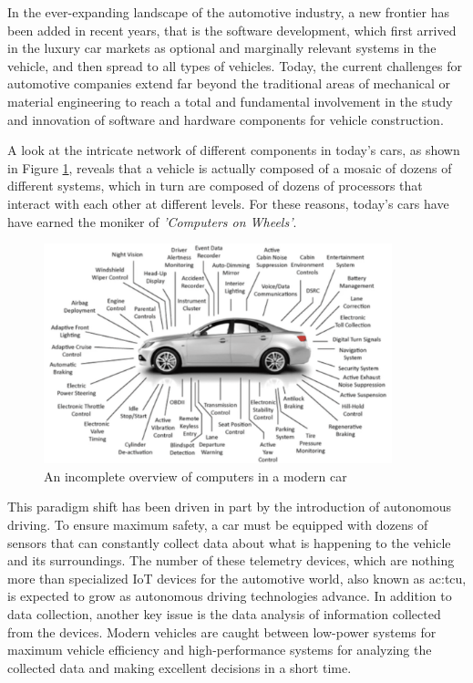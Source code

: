 In the ever-expanding landscape of the automotive industry, a new frontier has been added in recent years, that is the software development, which first arrived in the luxury car markets as optional and marginally relevant systems in the vehicle, and then spread to all types of vehicles. Today, the current challenges for automotive companies extend far beyond the traditional areas of mechanical or material engineering to reach a total and fundamental involvement in the study and innovation of software and hardware components for vehicle construction. 

A look at the intricate network of different components in today's cars, as shown in Figure \ref{fig:VheicleProcessors}, reveals that a vehicle is actually composed of a mosaic of dozens of different systems, which in turn are composed of dozens of processors that interact with each other at different levels. For these reasons, today's cars have have earned the moniker of \textit{'Computers on Wheels'}.
\begin{figure}[h]  %
  \centering
  \includegraphics[width=0.9\textwidth]{images/vehicle_processors.png}  %
  \caption{An incomplete overview of computers in a modern car \cite{ieeeSoftwareDefinedVehicle}}
  \label{fig:VheicleProcessors}
\end{figure}

This paradigm shift has been driven in part by the introduction of autonomous driving. To ensure maximum safety, a car must be equipped with dozens of sensors that can constantly collect data about what is happening to the vehicle and its surroundings. The number of these telemetry devices, which are nothing more than specialized IoT devices for the automotive world, also known as \gls{ac:tcu}, is expected to grow as autonomous driving technologies advance. In addition to data collection, another key issue is the data analysis of information collected from the devices. Modern vehicles are caught between low-power systems for maximum vehicle efficiency and high-performance systems for analyzing the collected data and making excellent decisions in a short time.

